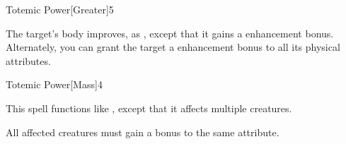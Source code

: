 \begin{spellsection}{Totemic Power}[Greater]{5}
    \begin{spellheader}
    \end{spellheader}
    \begin{spellcontent}
        \begin{spelltargetinginfo}
        \end{spelltargetinginfo}
        \begin{spelleffects}
            \spelleffect The target's body improves, as , except that it gains a  enhancement bonus. Alternately, you can grant the target a  enhancement bonus to all its physical attributes.
            \spelldur \durpersonallong
        \end{spelleffects}
    \end{spellcontent}
    \begin{spellfooter}
    \end{spellfooter}
\end{spellsection}

\begin{spellsection}{Totemic Power}[Mass]{4}
    \begin{spellheader}
    \end{spellheader}
    \begin{spellcontent}
        \begin{spelltargetinginfo}
        \end{spelltargetinginfo}
        \begin{spelleffects}
            \spellspecial This spell functions like , except that it affects multiple creatures.
            \spelldur \durshort
        \end{spelleffects}
    \end{spellcontent}
    \begin{spellfooter}
        \spellnotes All affected creatures must gain a bonus to the same attribute.
    \end{spellfooter}
\end{spellsection}

